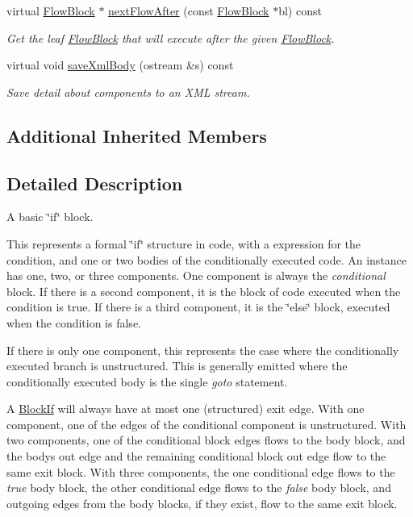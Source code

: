 \begin{DoxyCompactItemize}
virtual \mbox{\hyperlink{class_flow_block}{Flow\+Block}} $\ast$ \mbox{\hyperlink{class_block_if_adbc4cd5fb6cad60aa333c12532b55e1f}{next\+Flow\+After}} (const \mbox{\hyperlink{class_flow_block}{Flow\+Block}} $\ast$bl) const
\begin{DoxyCompactList}\small\item\em Get the leaf \mbox{\hyperlink{class_flow_block}{Flow\+Block}} that will execute after the given \mbox{\hyperlink{class_flow_block}{Flow\+Block}}. \end{DoxyCompactList}\item 
virtual void \mbox{\hyperlink{class_block_if_ae2abef245decb84faf212ce156389d9e}{save\+Xml\+Body}} (ostream \&s) const
\begin{DoxyCompactList}\small\item\em Save detail about components to an X\+ML stream. \end{DoxyCompactList}\end{DoxyCompactItemize}
\subsection*{Additional Inherited Members}


\subsection{Detailed Description}
A basic \char`\"{}if\char`\"{} block. 

This represents a formal \char`\"{}if\char`\"{} structure in code, with a expression for the condition, and one or two bodies of the conditionally executed code. An instance has one, two, or three components. One component is always the {\itshape conditional} block. If there is a second component, it is the block of code executed when the condition is true. If there is a third component, it is the \char`\"{}else\char`\"{} block, executed when the condition is false.

If there is only one component, this represents the case where the conditionally executed branch is unstructured. This is generally emitted where the conditionally executed body is the single {\itshape goto} statement.

A \mbox{\hyperlink{class_block_if}{Block\+If}} will always have at most one (structured) exit edge. With one component, one of the edges of the conditional component is unstructured. With two components, one of the conditional block edges flows to the body block, and the body\textquotesingle{}s out edge and the remaining conditional block out edge flow to the same exit block. With three components, the one conditional edge flows to the {\itshape true} body block, the other conditional edge flows to the {\itshape false} body block, and outgoing edges from the body blocks, if they exist, flow to the same exit block. 

